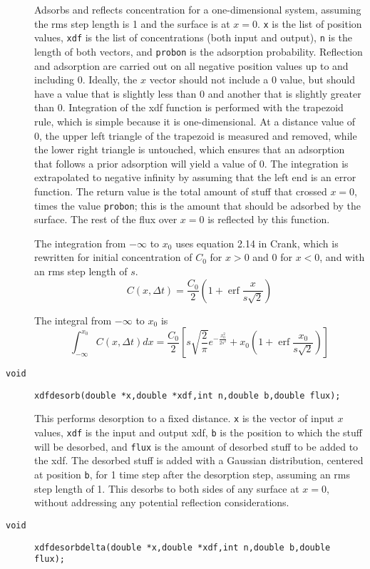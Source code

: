 \documentclass[11pt]{article}
\newcommand {\ttt} {\texttt}
\DeclareMathOperator{\erf}{erf}
\begin{document}
\begin{description}
Adsorbs and reflects concentration for a one-dimensional system, assuming the rms step length is 1 and the surface is at $x = 0$. \ttt{x} is the list of position values, \ttt{xdf} is the list of concentrations (both input and output), \ttt{n} is the length of both vectors, and \ttt{probon} is the adsorption probability. Reflection and adsorption are carried out on all negative position values up to and including 0. Ideally, the $x$ vector should not include a 0 value, but should have a value that is slightly less than 0 and another that is slightly greater than 0. Integration of the xdf function is performed with the trapezoid rule, which is simple because it is one-dimensional. At a distance value of 0, the upper left triangle of the trapezoid is measured and removed, while the lower right triangle is untouched, which ensures that an adsorption that follows a prior adsorption will yield a value of 0. The integration is extrapolated to negative infinity by assuming that the left end is an error function. The return value is the total amount of stuff that crossed $x = 0$, times the value \ttt{probon}; this is the amount that should be adsorbed by the surface. The rest of the flux over $x = 0$ is reflected by this function.

The integration from $-\infty$ to $x_0$ uses equation 2.14 in Crank, which is rewritten for initial concentration of $C_0$ for $x > 0$ and 0 for $x < 0$, and with an rms step length of $s$.
$$C(x,\Delta t) = \frac{C_0}{2} \left( 1+ \erf \frac{x}{s\sqrt{2}} \right)$$

The integral from $-\infty$ to $x_0$ is
$$\int_{-\infty}^{x_0} C(x,\Delta t) dx = \frac{C_0}{2} \left[s \sqrt{\frac{2}{\pi}}e^{-\frac{x_0^2}{2s^2}} + x_0 \left(1+ \erf \frac{x_0}{s\sqrt{2}} \right) \right]$$


\item[\ttt{void}] 
\ttt{xdfdesorb(double *x,double *xdf,int n,double b,double flux);}

This performs desorption to a fixed distance. \ttt{x} is the vector of input $x$ values, \ttt{xdf} is the input and output xdf, \ttt{b} is the position to which the stuff will be desorbed, and \ttt{flux} is the amount of desorbed stuff to be added to the xdf. The desorbed stuff is added with a Gaussian distribution, centered at position \ttt{b}, for 1 time step after the desorption step, assuming an rms step length of 1. This desorbs to both sides of any surface at $x = 0$, without addressing any potential reflection considerations.


\item[\ttt{void}] 
\ttt{xdfdesorbdelta(double *x,double *xdf,int n,double b,double flux);}


\end{description}
\end{document}
